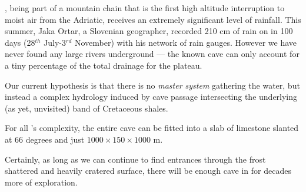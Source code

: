 , being part of a mountain chain that is the first high altitude
interruption to moist air from the Adriatic, receives an extremely
significant level of rainfall. This summer, Jaka Ortar, a Slovenian
geographer, recorded 210 cm of rain on  in 100 days (28\(^{th}\)
July-3\(^{rd}\) November) with his network of rain gauges. However we
have never found any large rivers underground --- the known cave can
only account for a tiny percentage of the total drainage for the
plateau.

Our current hypothesis is that there is no \textit{master system}
gathering the water, but instead a complex hydrology induced by cave
passage intersecting the underlying (as yet, unvisited) band of
Cretaceous shales.

For all 's complexity, the entire cave can be fitted
into a slab of limestone slanted at 66 degrees and just
\(1000\times150\times1000\) m.

Certainly, as long as we can continue to find entrances through the
frost shattered and heavily cratered surface, there will be enough cave
in  for decades more of exploration.

